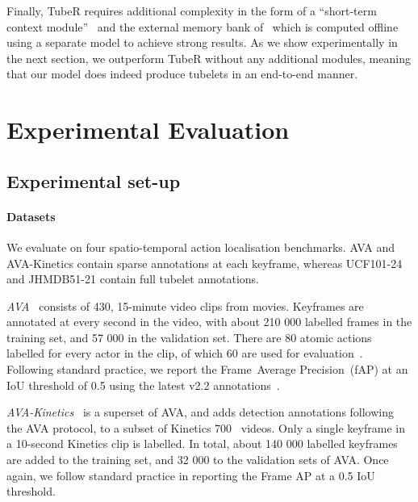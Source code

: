 \documentclass[10pt,twocolumn,letterpaper]{article}
\begin{document}
Finally, TubeR requires additional complexity in the form of a ``short-term context module''~\cite{zhao2022tuber} and the external memory bank of~\cite{wu_cvpr_2019} which is computed offline using a separate model to achieve strong results.
As we show experimentally in the next section, we outperform TubeR without any additional modules, meaning that our model does indeed produce tubelets in an end-to-end manner.





 \section{Experimental Evaluation}

\subsection{Experimental set-up}

\paragraph{Datasets}
We evaluate on four spatio-temporal action localisation benchmarks.
AVA and AVA-Kinetics contain sparse annotations at each keyframe, whereas UCF101-24 and JHMDB51-21 contain full tubelet annotations.


\textit{AVA~\cite{gu_cvpr_2018}} consists of 430, 15-minute video clips from movies.
Keyframes are annotated at every second in the video, with about 210 000 labelled frames in the training set, and 57 000 in the validation set.
There are 80 atomic actions labelled for every actor in the clip, of which 60 are used for evaluation~\cite{gu_cvpr_2018}. 
Following standard practice, we report the Frame~Average Precision~(fAP) at an IoU threshold of 0.5 using the latest v2.2 annotations~\cite{gu_cvpr_2018}.

\textit{AVA-Kinetics~\cite{li2020ava}} is a superset of AVA, and adds detection annotations following the AVA protocol, to a subset of Kinetics 700~\cite{carreira2019short} videos.
Only a single keyframe in a 10-second Kinetics clip is labelled.
In total, about 140 000 labelled keyframes are added to the training set, and 32 000 to the validation sets of AVA. 
Once again, we follow standard practice in reporting the Frame AP at a 0.5 IoU threshold. 
\end{document}
